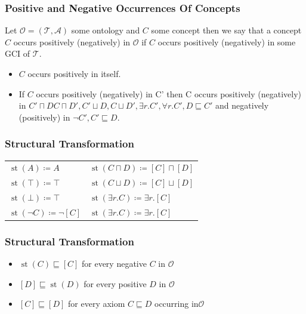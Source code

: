 \documentclass{beamer}
\DeclareMathOperator{\st}{st}
\begin{document}
\begin{frame}
    \frametitle{Positive and Negative Occurrences Of Concepts}
  Let $\mathcal{O} = (\mathcal{T}, \mathcal{A})$ some ontology and $C$ some concept then we say that a concept $C$ occurs positively (negatively) in $\mathcal{O}$ if
  $C$ occurs positively (negatively) in some GCI of $\mathcal{T}$. \\
  \begin{itemize}
    \item $C$ occurs positively in itself.
    \item If $C$ occurs positively (negatively) in C' then C occurs positively (negatively) in
    $C' \sqcap D C \sqcap D', C' \sqcup D, C \sqcup D', \exists r.C', \forall r.C', D \sqsubseteq C'$ 
    and negatively (positively) in $\neg C',C' \sqsubseteq D$.
  \end{itemize}
    
  
    \end{frame}

\begin{frame}
\frametitle{Structural Transformation}
\begin{center}

    \begin{tabular}{l l }
    $\st(A) \coloneqq  A$ & $\st(C \sqcap D) \coloneqq  [C] \sqcap [D]$\\
    $\st(\top) \coloneqq \top$ & $\st(C \sqcup D) \coloneqq [C] \sqcup [D]$ \\
    $\st(\bot) \coloneqq \top$ & $\st(\exists r.C) \coloneqq \exists r.[C]$\\
    $\st(\neg C) \coloneqq \neg [C]$ & $\st(\exists r.C) \coloneqq \exists r.[C]$\\
    \end{tabular}
    
    \end{center}
\end{frame}

\begin{frame}
    \frametitle{Structural Transformation}
        \begin{itemize}
            \item $ \st(C) \sqsubseteq [C]$ for every negative $C$ in $\mathcal{O}$ 
            \item $ [D]\sqsubseteq \st(D)$ for every positive $D$ in $\mathcal{O}$
            \item $ [C] \sqsubseteq [D]$ for every axiom $C \sqsubseteq D$ occurring in$ \mathcal{O}$
          \end{itemize}
    \end{frame}
\end{document}
